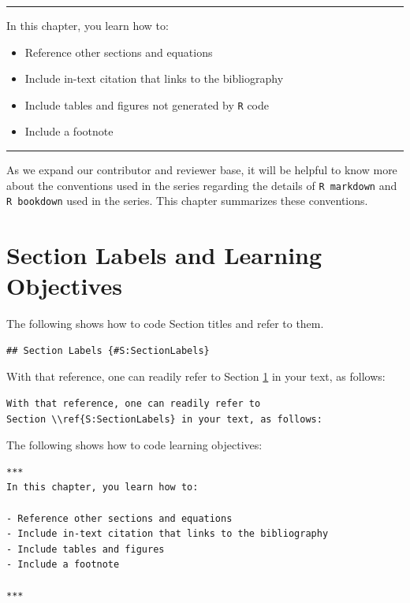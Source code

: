 \documentclass[]{book}
\providecommand{\tightlist}{%
  \setlength{\itemsep}{0pt}\setlength{\parskip}{0pt}}
\theoremstyle{definition}
\theoremstyle{definition}
\theoremstyle{definition}
\theoremstyle{remark}
\begin{document}
\begin{center}\rule{0.5\linewidth}{\linethickness}\end{center}

In this chapter, you learn how to:

\begin{itemize}
\tightlist
\item
  Reference other sections and equations
\item
  Include in-text citation that links to the bibliography
\item
  Include tables and figures not generated by \texttt{R} code
\item
  Include a footnote
\end{itemize}

\begin{center}\rule{0.5\linewidth}{\linethickness}\end{center}

As we expand our contributor and reviewer base, it will be helpful to
know more about the conventions used in the series regarding the details
of \texttt{R\ markdown} and \texttt{R\ bookdown} used in the series.
This chapter summarizes these conventions.

\section{Section Labels and Learning Objectives}\label{S:SectionLabels}

The following shows how to code Section titles and refer to them.

\begin{verbatim}
## Section Labels {#S:SectionLabels}
\end{verbatim}

With that reference, one can readily refer to Section
\ref{S:SectionLabels} in your text, as follows:

\begin{verbatim}
With that reference, one can readily refer to 
Section \\ref{S:SectionLabels} in your text, as follows:
\end{verbatim}

The following shows how to code learning objectives:

\begin{verbatim}
***
In this chapter, you learn how to:
  
- Reference other sections and equations
- Include in-text citation that links to the bibliography
- Include tables and figures
- Include a footnote

***

\end{verbatim}
\end{document}
